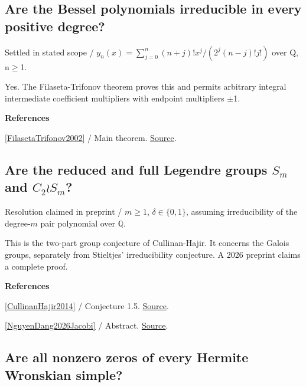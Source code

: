\documentclass[11pt,a4paper,oneside,openany]{book}
\newenvironment{sources}{\par\smallskip\begingroup\footnotesize\color{atlasgray}\leftskip=10pt\setlength{\parskip}{2pt}}{\par\endgroup\smallskip}
\begin{document}
\subsection*{Are the Bessel polynomials irreducible in every positive degree?}
{\small\sffamily\color{atlasgold}Settled in stated scope / \(y_n(x)=\sum_{j=0}^n (n+j)!x^j/(2^j(n-j)!j!)\) over Q, n\ensuremath{\ge}1.}\par\smallskip
\color{black} Yes. The Filaseta-Trifonov theorem proves this and permits arbitrary integral intermediate coefficient multipliers with endpoint multipliers \ensuremath{\pm}1.\par
\begin{sources}
\textbf{References}\par\smallskip
\noindent\hyperlink{ref:FilasetaTrifonov2002}{[FilasetaTrifonov2002]} / Main theorem.  \href{https://doi.org/10.1515/crll.2002.069}{Source}.\par
\end{sources}\color{black}
\subsection*{Are the reduced and full Legendre groups \(S_m\) and \(C_2\wr S_m\)?}
{\small\sffamily\color{atlasgold}Resolution claimed in preprint / \(m\ge1\), \(\delta\in\{0,1\}\), assuming irreducibility of the degree-\(m\) pair polynomial over \(\mathbb Q\).}\par\smallskip
\color{black} This is the two-part group conjecture of Cullinan-Hajir. It concerns the Galois groups, separately from Stieltjes' irreducibility conjecture. A 2026 preprint claims a complete proof.\par
\begin{sources}
\textbf{References}\par\smallskip
\noindent\hyperlink{ref:CullinanHajir2014}{[CullinanHajir2014]} / Conjecture 1.5.  \href{https://doi.org/10.1016/j.indag.2014.01.004}{Source}.\par
\noindent\hyperlink{ref:NguyenDang2026Jacobi}{[NguyenDang2026Jacobi]} / Abstract.  \href{https://hexagonmath.org/2610.00468v1}{Source}.\par
\end{sources}\color{black}
\subsection*{Are all nonzero zeros of every Hermite Wronskian simple?}
\end{document}
